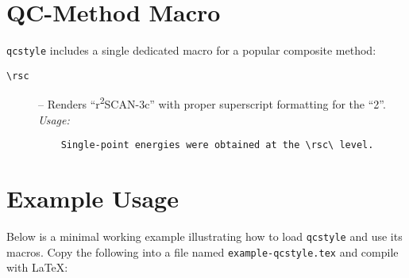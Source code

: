 \documentclass[a4paper,12pt]{article}
\begin{document}
\section{QC-Method Macro}
\label{sec:qcmethods}
\texttt{qcstyle} includes a single dedicated macro for a popular composite method:

\begin{description}
    \item[\texttt{\textbackslash rsc}] – Renders “r\textsuperscript{2}SCAN-3c” with proper superscript formatting for the “2”.\\
    \textit{Usage:}
    \begin{verbatim}
    Single-point energies were obtained at the \rsc\ level.
    \end{verbatim}
\end{description}

\section{Example Usage}
\label{sec:example}
Below is a minimal working example illustrating how to load \texttt{qcstyle} and use its macros. Copy the following into a file named \texttt{example-qcstyle.tex} and compile with \LaTeX:
\end{document}
